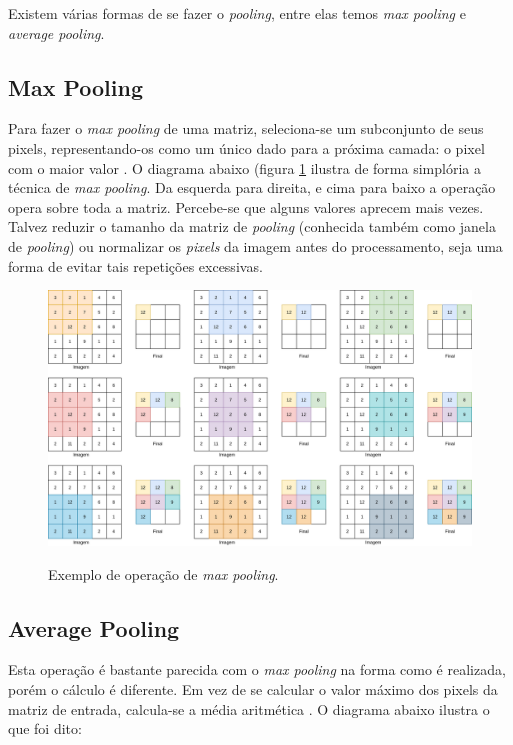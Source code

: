 Existem várias formas de se fazer o \textit{pooling}, entre elas temos \textit{max pooling} e \textit{average pooling}.

\subsection{Max Pooling}

Para fazer o \textit{max pooling} de uma matriz, seleciona-se um subconjunto de seus pixels, representando-os como um único dado para a próxima camada: o pixel com o maior valor \cite{zhang_dive_2021, brownlee_gentle_nodate}. O diagrama abaixo (figura \ref{fig:fig5} ilustra de forma simplória a técnica de \textit{max pooling}. Da esquerda para direita, e cima para baixo a operação opera sobre toda a matriz. Percebe-se que alguns valores aprecem mais vezes. Talvez reduzir o tamanho da matriz de \textit{pooling} (conhecida também como janela de \textit{pooling}) ou normalizar os \textit{pixels} da imagem antes do processamento, seja uma forma de evitar tais repetições excessivas.

\begin{figure}[H]
    \centering
    \caption{Exemplo de operação de \textit{max pooling}.}
    \includegraphics[width=13cm]{fig/Max Pooling.png}
    \label{fig:fig5}
\end{figure}

\subsection{Average Pooling}

Esta operação é bastante parecida com o \textit{max pooling} na forma como é realizada, porém o cálculo é diferente. Em vez de se calcular o valor máximo dos pixels da matriz de entrada, calcula-se a média aritmética \cite{zhang_dive_2021, brownlee_gentle_nodate}. O diagrama abaixo ilustra o que foi dito:

